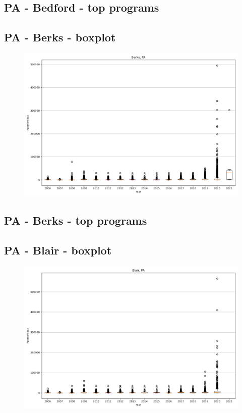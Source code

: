 \subsection*{PA - Bedford - top programs}

\newpage
\subsection*{PA - Berks - boxplot}
\begin{figure}[h]
\centering
\includegraphics[width=7in]{../output/boxplots/counties/Berks-PA_boxplot.png}
\end{figure}


\subsection*{PA - Berks - top programs}

\newpage
\subsection*{PA - Blair - boxplot}
\begin{figure}[h]
\centering
\includegraphics[width=7in]{../output/boxplots/counties/Blair-PA_boxplot.png}
\end{figure}


